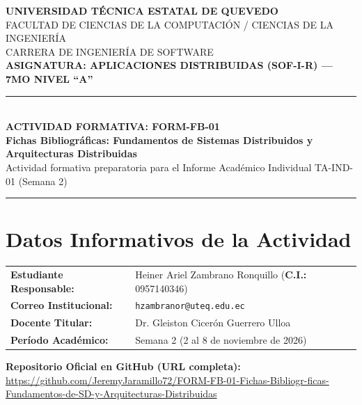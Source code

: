\documentclass[11pt,a4paper]{article}
\begin{document}
\begin{center}
    {\large\bfseries UNIVERSIDAD TÉCNICA ESTATAL DE QUEVEDO}\\[0.2em]
    {\normalsize FACULTAD DE CIENCIAS DE LA COMPUTACIÓN / CIENCIAS DE LA INGENIERÍA}\\[0.1em]
    {\normalsize CARRERA DE INGENIERÍA DE SOFTWARE}\\[0.25em]
    {\bfseries ASIGNATURA: APLICACIONES DISTRIBUIDAS (SOF-I-R) --- 7MO NIVEL ``A''}\\[0.4em]
    \rule{\textwidth}{1.2pt}\\[0.3em]
    {\Large\bfseries ACTIVIDAD FORMATIVA: FORM-FB-01}\\[0.2em]
    {\large\bfseries Fichas Bibliográficas: Fundamentos de Sistemas Distribuidos y Arquitecturas Distribuidas}\\[0.2em]
    {\small Actividad formativa preparatoria para el Informe Académico Individual TA-IND-01 (Semana 2)}
    \rule{\textwidth}{1.2pt}
\end{center}

\vspace{0.2em}

\section{Datos Informativos de la Actividad}

\begin{table}[h!]
\normalsize
\renewcommand{\arraystretch}{1.15}
\begin{tabularx}{\textwidth}{@{}lX@{}}
\toprule
\textbf{Estudiante Responsable:} & Heiner Ariel Zambrano Ronquillo \quad (\textbf{C.I.:} 0957140346) \\
\textbf{Correo Institucional:} & \texttt{hzambranor@uteq.edu.ec} \\
\textbf{Docente Titular:} & Dr. Gleiston Cicerón Guerrero Ulloa \\
\textbf{Período Académico:} & Semana 2 (2 al 8 de noviembre de 2026) \\
\bottomrule
\end{tabularx}
\end{table}

\textbf{Repositorio Oficial en GitHub (URL completa):}\\[0.2em]
{\fontsize{7.5pt}{9pt}\selectfont\url{https://github.com/JeremyJaramillo72/FORM-FB-01-Fichas-Bibliogr-ficas-Fundamentos-de-SD-y-Arquitecturas-Distribuidas}}
\end{document}
